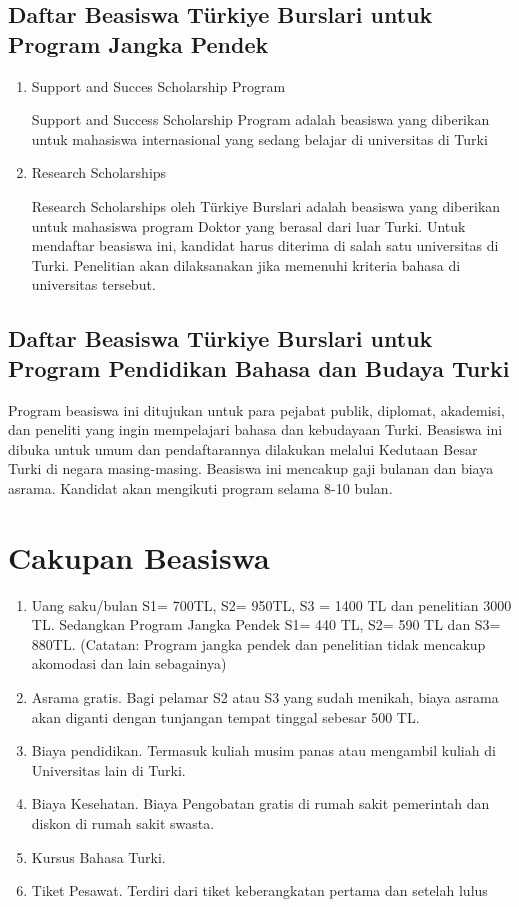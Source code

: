 \subsection{Daftar Beasiswa Türkiye Burslari untuk Program Jangka Pendek}

\begin{enumerate} 
\item Support and Succes Scholarship Program

Support and Success Scholarship Program adalah beasiswa yang diberikan untuk mahasiswa internasional yang sedang belajar di universitas di Turki

\item Research Scholarships

Research Scholarships oleh Türkiye Burslari adalah beasiswa yang diberikan untuk mahasiswa program Doktor yang berasal dari luar Turki. Untuk mendaftar beasiswa ini, kandidat harus diterima di salah satu universitas di Turki. Penelitian akan dilaksanakan jika memenuhi kriteria bahasa di universitas tersebut.
\end{enumerate}

\subsection{Daftar Beasiswa Türkiye Burslari untuk Program Pendidikan Bahasa dan Budaya Turki}

Program beasiswa ini ditujukan untuk para pejabat publik, diplomat, akademisi, dan peneliti yang ingin mempelajari bahasa dan kebudayaan Turki. Beasiswa ini dibuka untuk umum dan pendaftarannya dilakukan melalui Kedutaan Besar Turki di negara masing-masing. Beasiswa ini mencakup gaji bulanan dan biaya asrama. Kandidat akan mengikuti program selama 8-10 bulan.

\section{Cakupan Beasiswa}

\begin{enumerate}
\item Uang saku/bulan S1= 700TL, S2= 950TL, S3 = 1400 TL dan penelitian 3000 TL. Sedangkan Program Jangka Pendek S1= 440 TL, S2= 590 TL dan S3=  880TL. (Catatan:  Program jangka pendek dan penelitian tidak mencakup akomodasi dan lain sebagainya)
\item Asrama gratis. Bagi pelamar S2 atau S3 yang sudah menikah, biaya asrama akan diganti dengan tunjangan tempat tinggal sebesar 500 TL.
\item Biaya pendidikan. Termasuk kuliah musim panas atau mengambil kuliah di Universitas lain di Turki.
\item Biaya Kesehatan. Biaya Pengobatan gratis di rumah sakit pemerintah dan diskon di rumah sakit swasta.
\item Kursus Bahasa Turki.
\item Tiket Pesawat. Terdiri dari tiket keberangkatan pertama dan setelah lulus
\end{enumerate}

